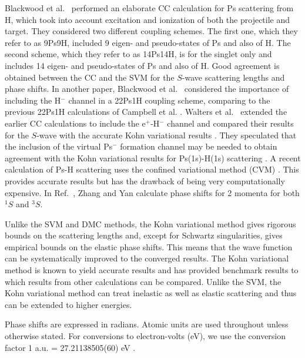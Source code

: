 \documentclass[preprint,showpacs,showkeys,preprintnumbers,amsmath,amssymb,longbibliography,pra,aps]{revtex4-1}
\begin{document}
Blackwood et al.~\cite{Blackwood2002} performed an elaborate CC calculation 
for Ps scattering from H, which took into account excitation and ionization 
of both the projectile and target. They considered two different coupling 
schemes. The first one, which they refer to as 9Ps9H, included 9 eigen- and 
pseudo-states of Ps and also of H. The second scheme, which they refer to as 
14Ps14H, is for the singlet only and includes 14 eigen- and pseudo-states of 
Ps and also of H. Good agreement is obtained between the CC
\cite{Blackwood2002} and the SVM \cite{Ivanov2002} for the $S$-wave scattering
lengths and phase shifts. In another paper, Blackwood et
al.~\cite{Blackwood2002b} considered the importance of including the H$^-$
channel in a 22Ps1H coupling scheme, comparing to the previous 22Ps1H
calculations of Campbell et al. \cite{Campbell1998}. Walters et
al.~\cite{Walters2004} extended the earlier CC calculations
\cite{Blackwood2002} to include the e$^+$-H$^-$ channel
\cite{Blackwood2002b} and compared their results for the $S$-wave with the
accurate Kohn variational results \cite{VanReeth2003}. They speculated that the
inclusion of the virtual Ps$^-$ formation channel may be needed to obtain 
agreement with the Kohn variational results for Ps(1s)-H(1s) scattering 
\cite{Blackwood2002}. A recent calculation of Ps-H scattering uses the
confined variational method (CVM) \cite{Zhang2012}. This provides accurate
results but has the drawback of being very computationally expensive. In
Ref.~\cite{Zhang2012}, Zhang and Yan calculate phase shifts for 2 momenta for
both $^1S$ and $^3S$.

Unlike the SVM and DMC methods, the Kohn variational method gives rigorous 
bounds on the scattering lengths and, except for Schwartz singularities, 
gives empirical bounds on the elastic phase shifts. This means that the wave 
function can be systematically improved to the converged results. The Kohn 
variational method is known to yield accurate results and has provided 
benchmark results \cite{VanReeth2003,VanReeth2004} to which results from 
other calculations can be compared. Unlike the SVM, the Kohn variational 
method can treat inelastic as well as elastic scattering and thus can be 
extended to higher energies. 

Phase shifts are expressed in radians. Atomic units are used throughout 
unless otherwise stated. For conversions to electron-volts (eV), we use the 
conversion factor 1 a.u. = {27.21138505(60) eV}
\cite{Mohr2012,*NISTConversions}.

\end{document}
